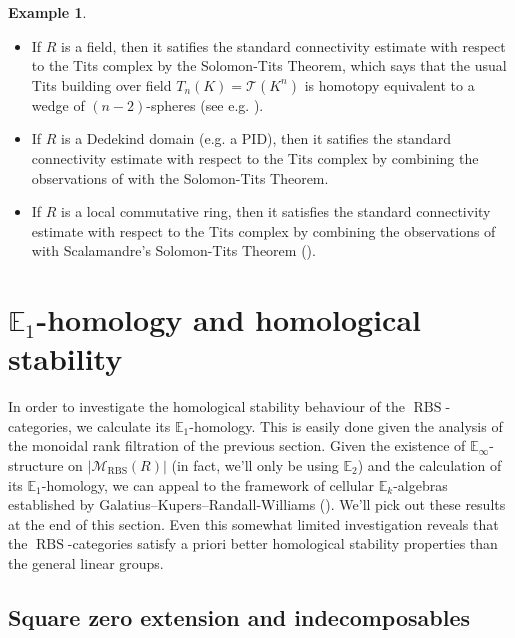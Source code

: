 \documentclass[12pt, reqno]{amsart}
\theoremstyle{plain}
\theoremstyle{definition}
\newtheorem{example}[theorem]{Example}
\begin{document}
\begin{example} \ 
\begin{itemize}
\item If $R$ is a field, then it satifies the standard connectivity estimate with respect to the Tits complex by the Solomon-Tits Theorem, which says that the usual Tits building over field $T_n(K)=\mathcal{T}(K^n)$ is homotopy equivalent to a wedge of $(n-2)$-spheres (see e.g. \cite{Quillen72}).
\item If $R$ is a Dedekind domain (e.g. a PID), then it satifies the standard connectivity estimate with respect to the Tits complex by combining the observations of  with the Solomon-Tits Theorem.
\item If $R$ is a local commutative ring, then it satisfies the standard connectivity estimate with respect to the Tits complex by combining the observations of \Cref{examples} with Scalamandre's Solomon-Tits Theorem (\cite[Theorem A]{Scalamandre}).\qedhere
\end{itemize}
\end{example}



\section{\texorpdfstring{$\mathbb{E}_1$}{E1}-homology and homological stability}\label{homological stability}

In order to investigate the homological stability behaviour of the $\operatorname{RBS}$-categories, we calculate its $\mathbb{E}_1$-homology. This is easily done given the analysis of the monoidal rank filtration of the previous section. Given the existence of $\mathbb{E}_\infty$-structure on $|\mathscr{M}_{\operatorname{RBS}}(R)|$ (in fact, we'll only be using $\mathbb{E}_2$) and the calculation of its $\mathbb{E}_1$-homology, we can appeal to the framework of cellular $\mathbb{E}_k$-algebras established by Galatius--Kupers--Randall-Williams (\cite{GalatiusKupersRandalWilliams}). We'll pick out these results at the end of this section. Even this somewhat limited investigation reveals that the $\operatorname{RBS}$-categories satisfy a priori better homological stability properties than the general linear groups.

\subsection{Square zero extension and indecomposables}
\end{document}
